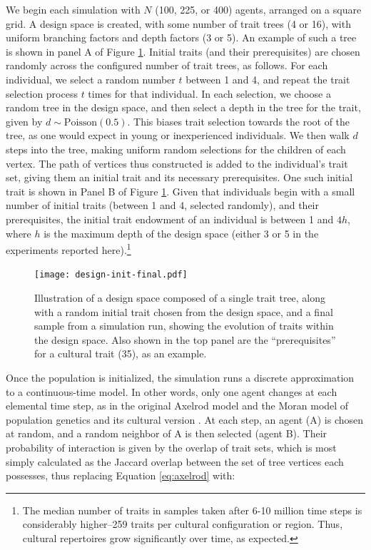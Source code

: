 \documentclass[graybox,natbib]{svmult}
\begin{document}
We begin each simulation with $N$ (100, 225, or 400) agents, arranged on
a square grid. A design space is created, with some number of trait
trees (4 or 16), with uniform branching factors and depth factors (3 or
5). An example of such a tree is shown in panel A of Figure
\ref{img:prereq}. Initial traits (and their prerequisites) are chosen
randomly across the configured number of trait trees, as follows. For
each individual, we select a random number $t$ between 1 and 4, and
repeat the trait selection process $t$ times for that individual. In
each selection, we choose a random tree in the design space, and then
select a depth in the tree for the trait, given by
$d  \sim \textrm{Poisson}(0.5)$. This biases trait selection towards the
root of the tree, as one would expect in young or inexperienced
individuals. We then walk $d$ steps into the tree, making uniform random
selections for the children of each vertex. The path of vertices thus
constructed is added to the individual's trait set, giving them an
initial trait and its necessary prerequisites. One such initial trait is
shown in Panel B of Figure \ref{img:prereq}. Given that individuals
begin with a small number of initial traits (between 1 and 4, selected
randomly), and their prerequisites, the initial trait endowment of an
individual is between 1 and $4h$, where $h$ is the maximum depth of the
design space (either 3 or 5 in the experiments reported here).\footnote{The
  median number of traits in samples taken after 6-10 million time steps
  is considerably higher--259 traits per cultural configuration or
  region. Thus, cultural repertoires grow significantly over time, as
  expected.}

\begin{figure}[htbp] 
\centering 
\texttt{[image: design-init-final.pdf]} 
\caption{Illustration of a design space composed of a single trait tree, along with a random initial trait chosen from the design space, and a final sample from a simulation run, showing the evolution of traits within the design space.  Also shown in the top panel are the ``prerequisites'' for a cultural trait (35), as an example.} 
\label{img:prereq} 
\end{figure}

Once the population is initialized, the simulation runs a discrete
approximation to a continuous-time model. In other words, only one agent
changes at each elemental time step, as in the original Axelrod model
and the Moran model of population genetics and its cultural version
\citep{aoki2011rates, moran1962statistical, moran1958random}. At each
step, an agent (A) is chosen at random, and a random neighbor of A is
then selected (agent B). Their probability of interaction is given by
the overlap of trait sets, which is most simply calculated as the
Jaccard overlap between the set of tree vertices each possesses, thus
replacing Equation \ref{eq:axelrod} with:
\end{document}
